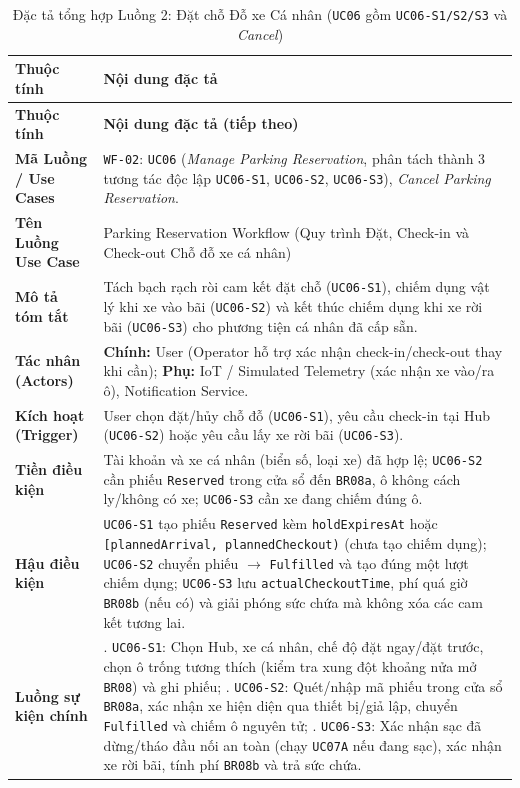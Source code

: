 {\small
\begin{longtable}{>{\raggedright\arraybackslash\bfseries}p{3.5cm} >{\raggedright\arraybackslash}p{\dimexpr\textwidth-3.5cm-4\tabcolsep\relax}}
\caption{Đặc tả tổng hợp Luồng 2: Đặt chỗ Đỗ xe Cá nhân (\texttt{UC06} gồm \texttt{UC06-S1/S2/S3} và \textit{Cancel})} \label{tab:wf-parking} \\
\toprule
Thuộc tính & \textbf{Nội dung đặc tả} \\
\midrule
\endfirsthead
\toprule
Thuộc tính & \textbf{Nội dung đặc tả (tiếp theo)} \\
\midrule
\endhead
\bottomrule
\endfoot
Mã Luồng / Use Cases & \texttt{WF-02}: \texttt{UC06} (\textit{Manage Parking Reservation}, phân tách thành 3 tương tác độc lập \texttt{UC06-S1}, \texttt{UC06-S2}, \texttt{UC06-S3}), \textit{Cancel Parking Reservation}. \\
Tên Luồng Use Case & Parking Reservation Workflow (Quy trình Đặt, Check-in và Check-out Chỗ đỗ xe cá nhân) \\
Mô tả tóm tắt & Tách bạch rạch ròi cam kết đặt chỗ (\texttt{UC06-S1}), chiếm dụng vật lý khi xe vào bãi (\texttt{UC06-S2}) và kết thúc chiếm dụng khi xe rời bãi (\texttt{UC06-S3}) cho phương tiện cá nhân đã cấp sẵn. \\
Tác nhân (Actors) & \textbf{Chính:} User (Operator hỗ trợ xác nhận check-in/check-out thay khi cần); \textbf{Phụ:} IoT / Simulated Telemetry (xác nhận xe vào/ra ô), Notification Service. \\
Kích hoạt (Trigger) & User chọn đặt/hủy chỗ đỗ (\texttt{UC06-S1}), yêu cầu check-in tại Hub (\texttt{UC06-S2}) hoặc yêu cầu lấy xe rời bãi (\texttt{UC06-S3}). \\
Tiền điều kiện & Tài khoản và xe cá nhân (biển số, loại xe) đã hợp lệ; \texttt{UC06-S2} cần phiếu \texttt{Reserved} trong cửa sổ đến \texttt{BR08a}, ô không cách ly/không có xe; \texttt{UC06-S3} cần xe đang chiếm đúng ô. \\
Hậu điều kiện & \texttt{UC06-S1} tạo phiếu \texttt{Reserved} kèm \texttt{holdExpiresAt} hoặc \texttt{[plannedArrival, plannedCheckout)} (chưa tạo chiếm dụng); \texttt{UC06-S2} chuyển phiếu $\rightarrow$ \texttt{Fulfilled} và tạo đúng một lượt chiếm dụng; \texttt{UC06-S3} lưu \texttt{actualCheckoutTime}, phí quá giờ \texttt{BR08b} (nếu có) và giải phóng sức chứa mà không xóa các cam kết tương lai. \\
Luồng sự kiện chính & 1. \texttt{UC06-S1}: Chọn Hub, xe cá nhân, chế độ đặt ngay/đặt trước, chọn ô trống tương thích (kiểm tra xung đột khoảng nửa mở \texttt{BR08}) và ghi phiếu; \newline 2. \texttt{UC06-S2}: Quét/nhập mã phiếu trong cửa sổ \texttt{BR08a}, xác nhận xe hiện diện qua thiết bị/giả lập, chuyển \texttt{Fulfilled} và chiếm ô nguyên tử; \newline 3. \texttt{UC06-S3}: Xác nhận sạc đã dừng/tháo đầu nối an toàn (chạy \texttt{UC07A} nếu đang sạc), xác nhận xe rời bãi, tính phí \texttt{BR08b} và trả sức chứa. \\

\end{longtable}}
